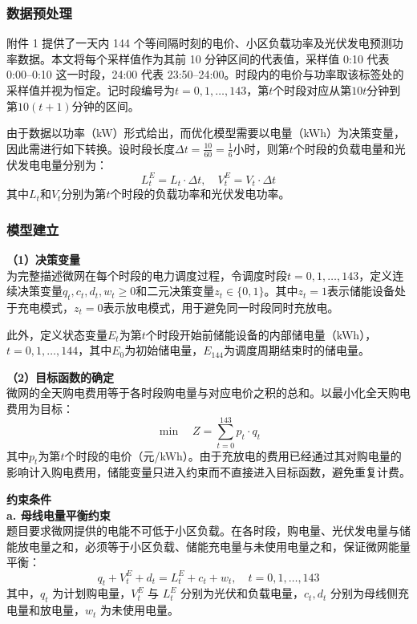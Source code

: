 \documentclass[12pt,a4paper]{ctexart}
\theoremstyle{definition}
\theoremstyle{plain}
\theoremstyle{remark}
\begin{document}
\subsubsection{数据预处理}

附件 1 提供了一天内 144 个等间隔时刻的电价、小区负载功率及光伏发电预测功率数据。本文将每个采样值作为其前 10 分钟区间的代表值，采样值 0:10 代表 0:00–0:10 这一时段，24:00 代表 23:50–24:00。时段内的电价与功率取该标签处的采样值并视为恒定。记时段编号为$t=0,1,\ldots,143$，第$t$个时段对应从第$10t$分钟到第$10(t+1)$分钟的区间。

由于数据以功率（kW）形式给出，而优化模型需要以电量（kWh）为决策变量，因此需进行如下转换。设时段长度$\Delta t = \frac{10}{60} = \frac{1}{6}$小时，则第$t$个时段的负载电量和光伏发电电量分别为：
\begin{equation}
  L_t^{E} = L_t \cdot \Delta t, \quad V_t^{E} = V_t \cdot \Delta t
  \label{eq:q1_energy_convert}
\end{equation}
\noindent 其中$L_t$和$V_t$分别为第$t$个时段的负载功率和光伏发电功率。

\subsubsection{模型建立}

\noindent\textbf{（1）决策变量}\\[6pt]
\indent 为完整描述微网在每个时段的电力调度过程，令调度时段$t = 0, 1, \ldots, 143$，定义连续决策变量$q_t, c_t, d_t, w_t \geq 0$和二元决策变量$z_t \in \{0, 1\}$。其中$z_t = 1$表示储能设备处于充电模式，$z_t = 0$表示放电模式，用于避免同一时段同时充放电。

此外，定义状态变量$E_t$为第$t$个时段开始前储能设备的内部储电量（kWh），$t = 0, 1, \ldots, 144$，其中$E_0$为初始储电量，$E_{144}$为调度周期结束时的储电量。

\noindent\textbf{（2）目标函数的确定}\\[6pt]
\indent 微网的全天购电费用等于各时段购电量与对应电价之积的总和。以最小化全天购电费用为目标：
\begin{equation}
  \boxed{\min \quad Z = \sum_{t=0}^{143} p_t \cdot q_t}
  \label{eq:q1_obj}
\end{equation}
\noindent 其中$p_t$为第$t$个时段的电价（元/kWh）。由于充放电的费用已经通过其对购电量的影响计入购电费用，储能变量只进入约束而不直接进入目标函数，避免重复计费。

\noindent\textbf{约束条件}\\[6pt]
\noindent\textbf{a. 母线电量平衡约束}\\[4pt]
\indent 题目要求微网提供的电能不可低于小区负载。在各时段，购电量、光伏发电量与储能放电量之和，必须等于小区负载、储能充电量与未使用电量之和，保证微网能量平衡：
\begin{equation}
  q_t + V_t^{E} + d_t = L_t^{E} + c_t + w_t, \quad t = 0, 1, \ldots, 143
  \label{eq:q1_bus_balance}
\end{equation}
其中，$q_t$ 为计划购电量，$V_t^{E}$ 与 $L_t^{E}$ 分别为光伏和负载电量，$c_t, d_t$ 分别为母线侧充电量和放电量，$w_t$ 为未使用电量。
\end{document}
